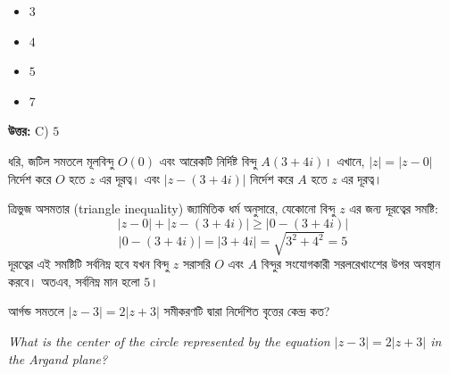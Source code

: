 \documentclass[12pt, a4paper]{article}
\begin{document}
\begin{itemize}[label={}, leftmargin=1cm, itemsep=0.5em]
    \item[\textbf{A)}] $3$
    \item[\textbf{B)}] $4$
    \item[\textbf{C)}] $5$
    \item[\textbf{D)}] $7$
\end{itemize}

\vspace{0.5em}
\begin{tcolorbox}[answerbox]
    \textbf{\color{success} উত্তর:} C) $5$
\end{tcolorbox}
\vspace{1em}

\begin{tcolorbox}[solutionbox={সমাধান (Solution)}]
    \noindent
    ধরি, জটিল সমতলে মূলবিন্দু $O(0)$ এবং আরেকটি নির্দিষ্ট বিন্দু $A(3+4i)$। এখানে, $|z| = |z - 0|$ নির্দেশ করে $O$ হতে $z$ এর দূরত্ব। এবং $|z - (3+4i)|$ নির্দেশ করে $A$ হতে $z$ এর দূরত্ব। 
    
    \vspace{0.5em}
    ত্রিভুজ অসমতার (triangle inequality) জ্যামিতিক ধর্ম অনুসারে, যেকোনো বিন্দু $z$ এর জন্য দূরত্বের সমষ্টি:
    \[ |z - 0| + |z - (3+4i)| \geq |0 - (3+4i)| \]
    \[ |0 - (3+4i)| = |3+4i| = \sqrt{3^2 + 4^2} = 5 \]
    দূরত্বের এই সমষ্টিটি সর্বনিম্ন হবে যখন বিন্দু $z$ সরাসরি $O$ এবং $A$ বিন্দুর সংযোগকারী সরলরেখাংশের উপর অবস্থান করবে। অতএব, সর্বনিম্ন মান হলো $5$।
\end{tcolorbox}
\begin{tcolorbox}[questionbox={প্রশ্ন (Question) 23}]
    \noindent
    আর্গন্ড সমতলে $|z - 3| = 2|z + 3|$ সমীকরণটি দ্বারা নির্দেশিত বৃত্তের কেন্দ্র কত?
    
    \vspace{0.8em}
    \begin{english}
    \noindent\textit{\color{darkgray}
    What is the center of the circle represented by the equation $|z - 3| = 2|z + 3|$ in the Argand plane?
    }
    \end{english}
\end{tcolorbox}
\end{document}
